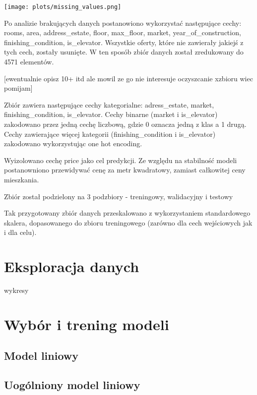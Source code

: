 \documentclass{article}
\begin{document}
\texttt{[image: plots/missing\_values.png]}

Po analizie brakujących danych postanowiono wykorzystać następujące cechy:
rooms, area, address\_estate, floor, max\_floor, market, year\_of\_construction, finishing\_condition, is\_elevator.
Wszystkie oferty, które nie zawierały jakiejś z tych cech, zostały usunięte. W ten sposób zbiór danych został zredukowany do 4571 elementów. 

[ewentualnie opisz 10+ itd ale mowil ze go nie interesuje oczyszcanie xzbioru wiec pomijam]

Zbiór zawiera następujące cechy kategorialne: adress\_estate, market, finishing\_condition, is\_elevator. Cechy binarne (market i is\_elevator) zakodowano przez jedną cechę liczbową, gdzie 0 oznacza jedną z klas a 1 drugą. Cechy zawierające więcej kategorii (finishing\_condition i is\_elevator) zakodowano wykorzystując one hot encoding.

Wyizolowano cechę price jako cel predykcji. Ze względu na stabilność modeli postanowniono przewidywać cenę za metr kwadratowy, zamiast całkowitej ceny mieszkania.

Zbiór został podzielony na 3 podzbiory - treningowy, walidacyjny i testowy

Tak przygotowany zbiór danych przeskalowano z wykorzystaniem standardowego skalera, dopasowanego do zbioru treningowego (zarówno dla cech wejściowych jak i dla celu).



\section{Eksploracja danych}
wykresy

\section{Wybór i trening modeli}

\subsection{Model liniowy}

\subsection{Uogólniony  model liniowy}
\end{document}
